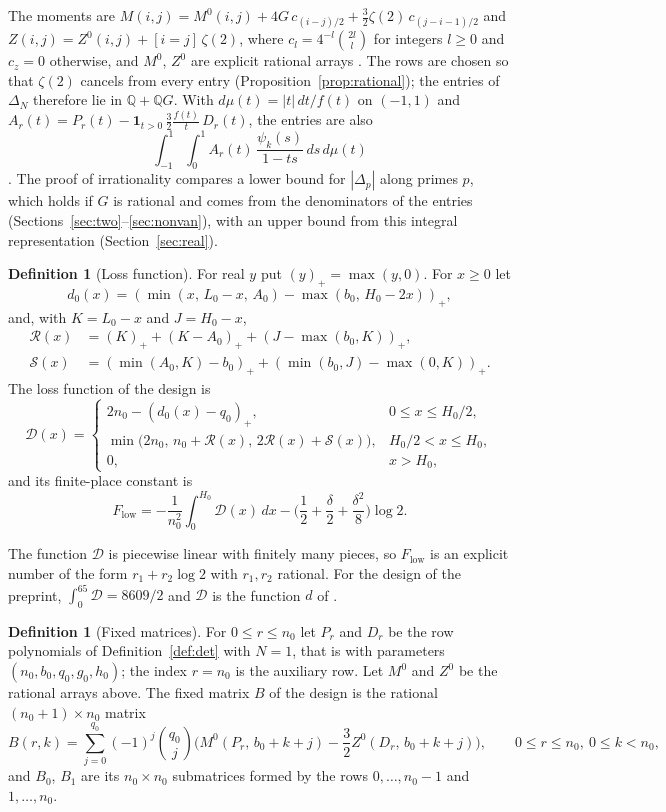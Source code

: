 \documentclass[11pt]{article}
\theoremstyle{definition}
\newtheorem{definition}[theorem]{Definition}
\newcommand{\pos}[1]{\left(#1\right)_{+}}
\newcommand{\Dl}{\mathcal{D}}
\newcommand{\Rl}{\mathcal{R}}
\newcommand{\Sl}{\mathcal{S}}
\begin{document}
The moments are $M(i,j)=M^0(i,j)+4G\,c_{(i-j)/2}+\frac32\zeta(2)\,c_{(j-i-1)/2}$ and $Z(i,j)=Z^0(i,j)+[i=j]\,\zeta(2)$, where $c_l=4^{-l}\binom{2l}l$ for integers $l\ge0$ and $c_z=0$ otherwise, and $M^0$, $Z^0$ are explicit rational arrays \cite[Eqs.~(14), (16), (17)]{OAI}. The rows are chosen so that $\zeta(2)$ cancels from every entry (Proposition~\ref{prop:rational}); the entries of $\Delta_N$ therefore lie in $\mathbb Q+\mathbb QG$. With $d\mu(t)=|t|\,dt/f(t)$ on $(-1,1)$ and $A_r(t)=P_r(t)-\mathbf 1_{t>0}\,\frac32\frac{f(t)}t\,D_r(t)$, the entries are also
\[
\int_{-1}^1\!\int_0^1A_r(t)\,\frac{\psi_k(s)}{1-ts}\,ds\,d\mu(t)
\]
\cite[Sec.~5.1]{OAI}. The proof of irrationality compares a lower bound for $|\Delta_p|$ along primes $p$, which holds if $G$ is rational and comes from the denominators of the entries (Sections~\ref{sec:two}--\ref{sec:nonvan}), with an upper bound from this integral representation (Section~\ref{sec:real}).



\begin{definition}[Loss function]\label{def:loss}
For real $y$ put $\pos{y}=\max(y,0)$. For $x\ge0$ let
\[
d_0(x)=\pos{\min(x,\,L_0-x,\,A_0)-\max(b_0,\,H_0-2x)},
\]
and, with $K=L_0-x$ and $J=H_0-x$,
\begin{align*}
\Rl(x)&=\pos{K}+\pos{K-A_0}+\pos{J-\max(b_0,K)},\\
\Sl(x)&=\pos{\min(A_0,K)-b_0}+\pos{\min(b_0,J)-\max(0,K)}.
\end{align*}
The loss function of the design is
\[
\Dl(x)=\begin{cases}
2n_0-\pos{d_0(x)-q_0}, & 0\le x\le H_0/2,\\
\min\big(2n_0,\,n_0+\Rl(x),\,2\Rl(x)+\Sl(x)\big), & H_0/2<x\le H_0,\\
0, & x>H_0,
\end{cases}
\]
and its finite-place constant is
\[
F_{\mathrm{low}}=-\frac{1}{n_0^2}\int_0^{H_0}\Dl(x)\,dx-\Big(\frac12+\frac{\delta}{2}+\frac{\delta^2}{8}\Big)\log2 .
\]
\end{definition}

The function $\Dl$ is piecewise linear with finitely many pieces, so $F_{\mathrm{low}}$ is an explicit number of the form $r_1+r_2\log2$ with $r_1,r_2$ rational. For the design of the preprint, $\int_0^{65}\Dl=8609/2$ and $\Dl$ is the function $d$ of \cite[Table~(43)]{OAI}.

\begin{definition}[Fixed matrices]\label{def:fixed}
For $0\le r\le n_0$ let $P_r$ and $D_r$ be the row polynomials of Definition~\ref{def:det} with $N=1$, that is with parameters $(n_0,b_0,q_0,g_0,h_0)$; the index $r=n_0$ is the auxiliary row. Let $M^0$ and $Z^0$ be the rational arrays above. The fixed matrix $B$ of the design is the rational $(n_0+1)\times n_0$ matrix
\[
B(r,k)=\sum_{j=0}^{q_0}(-1)^j\binom{q_0}{j}\Big(M^0(P_r,\,b_0+k+j)-\frac32Z^0(D_r,\,b_0+k+j)\Big),\qquad 0\le r\le n_0,\ 0\le k<n_0,
\]
and $B_0$, $B_1$ are its $n_0\times n_0$ submatrices formed by the rows $0,\dots,n_0-1$ and $1,\dots,n_0$.
\end{definition}
\end{document}
